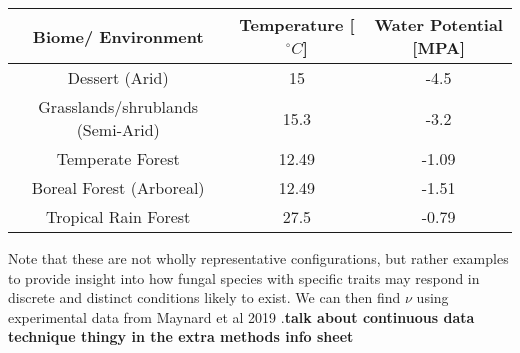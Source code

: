 \documentclass[12pt]{article}
\begin{document}
\begin{table}[H]
	\begin{center}
		\begin{tabular}{|c c c|} 
			\hline
			Biome/ Environment & Temperature [$^{\circ}C$] & Water Potential [MPA]\\ [0.5ex] 
			\hline\hline
			Dessert (Arid) & 15 & -4.5 \\ 
			\hline
			Grasslands/shrublands (Semi-Arid) &15.3 & -3.2\\
			\hline
			Temperate Forest & 12.49 & -1.09 \\
			\hline
			Boreal Forest (Arboreal)& 12.49 &  -1.51 \\
			\hline
			Tropical Rain Forest & 27.5 & -0.79 \\
			\hline
		\end{tabular}
		\vspace*{-3ex}
		\label{table2}
	\end{center}
\end{table}

Note that these are not wholly representative configurations, but rather examples to provide insight into how fungal species with specific traits may respond in discrete and distinct conditions likely to exist. We can then find $\nu$ using experimental data from Maynard et al 2019 \cite{Maynard2019}.\textbf{talk about continuous data technique thingy in the extra methods info sheet}
\end{document}
